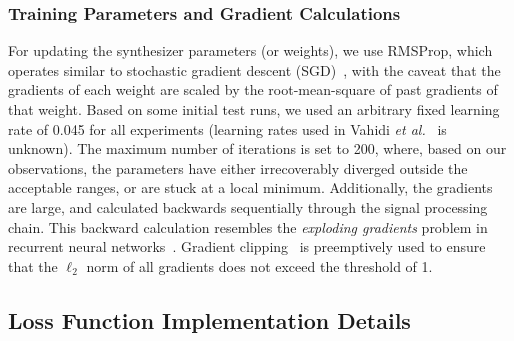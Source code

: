 \documentclass[lettersize,journal]{IEEEtran}
\begin{document}
\subsubsection{Training Parameters and Gradient Calculations}
 For updating the synthesizer parameters (or weights), we use RMSProp, which operates similar to stochastic gradient descent (SGD)~\cite{goodfellow2016deep}, with the caveat that the gradients of each weight are scaled by the root-mean-square of past gradients of that weight. Based on some initial test runs, we used an arbitrary fixed learning rate of 0.045 for all experiments (learning rates used in Vahidi \textit{et al.}~\cite{vahidi2023mesostructures} is unknown). The maximum number of iterations is set to 200, where, based on our observations, the parameters have either irrecoverably diverged outside the acceptable ranges, or are stuck at a local minimum. Additionally, the gradients are large, and calculated backwards sequentially through the signal processing chain. This backward calculation resembles the \textit{exploding gradients} problem in recurrent neural networks~\cite{gers2000learning}. Gradient clipping~\cite{goodfellow2016deep} is preemptively used to ensure that the  $\ell_2$ norm of all gradients does not exceed the threshold of 1. 


\subsection{Loss Function Implementation Details}
\label{sec:loss_implementation}
\end{document}
